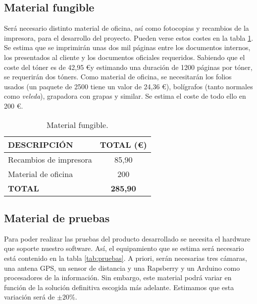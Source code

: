 \subsection{Material fungible}
\par Será necesario distinto material de oficina, así como fotocopias y recambios de la impresora, para el desarrollo del proyecto. Pueden verse estos costes en la tabla \ref{tab:fungible}. Se estima que se imprimirán unas dos mil páginas entre los documentos internos, los presentados al cliente y los documentos oficiales requeridos. Sabiendo que el coste del tóner es de 42,95 \euro y estimando una duración de 1200 páginas por tóner, se requerirán dos tóners.
Como material de oficina, se necesitarán los folios usados (un paquete de 2500 tiene un valor de 24,36 \euro), bolígrafos (tanto normales como \textit{veleda}), grapadora con grapas y similar. Se estima el coste de todo ello en 200 \euro.


\begin{table}[H]
\begin{center}
\begin{tabular}{l c}
\textbf{DESCRIPCIÓN} & \textbf{TOTAL (\euro)}\\ \hline \hline
Recambios de impresora & 85,90\\
Material de oficina & 200\\ \hline \hline
\textbf{TOTAL} & \textbf{285,90}\\ \hline
\end{tabular}
\caption{Material fungible.}
\label{tab:fungible}
\end{center}
\end{table}


\subsection{Material de pruebas}
\par Para poder realizar las pruebas del producto desarrollado se necesita el hardware que soporte nuestro software. Así, el equipamiento que se estima será necesario está contenido en la tabla \ref{tab:pruebas}. A priori, serán necesarias tres cámaras, una antena GPS, un sensor de distancia y una Rapsberry y un Arduino como procesadores de la información. Sin embargo, este material podrá variar en función de la solución definitiva escogida más adelante. Estimamos que esta variación será de $\pm20\%$.

